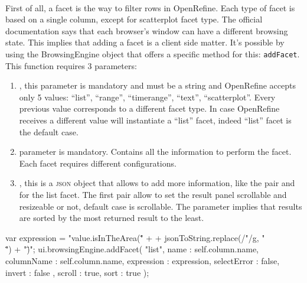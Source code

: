 \paragraph{} First of all, a facet is the way to filter rows in OpenRefine. Each type of facet is based on a single column, except for scatterplot facet type. The official documentation says that each browser's window can have a different browsing state. This implies that adding a facet is a client side matter. It's possible by using the BrowsingEngine object that offers a specific method for this: \texttt{addFacet}. This function requires 3 parameters: 
\begin{enumerate}
	\item {}, this parameter is mandatory and must be a string and OpenRefine accepts only 5 values: \textsf{``list''}, \textsf{``range''}, \textsf{``timerange''}, \textsf{``text''}, \textsf{``scatterplot''}. Every previous value corresponds to a different facet type. In case OpenRefine receives a different value will instantiate a \textsf{``list''} facet, indeed \textsf{``list''} facet is the default case.
	\item {} parameter is mandatory. Contains all the information to perform the facet. Each facet requires different configurations.
	\item {}, this is a \textsc{json} object that allows to add more information, like the pair  and  for the list facet. The first pair allow to set the result panel scrollable and resizeable or not, default case is scrollable. The  parameter implies that results are sorted by the most returned result to the least.
\end{enumerate}
\begin{code}
var expression = 
   "value.isInTheArea(\"" + 
     + jsonToString.replace(/"/g, "\\\"") + "\")";
ui.browsingEngine.addFacet(
   "list",
   {
      name : self.column.name,
      columnName : self.column.name,
      expression : expression,
      selectError : false,
      invert : false
    },
    {
       scroll : true,
       sort : true
    }
);
\end{code}
	
	
